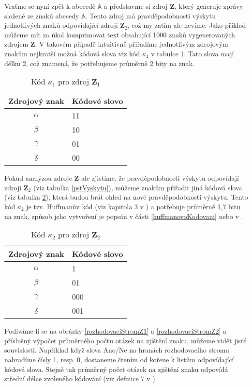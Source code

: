 Vraťme se nyní zpět k abecedě $\mathbb{A}$ a představme si zdroj $\mathbf{Z}$, který generuje zprávy složené ze znaků abecedy $\mathbb{A}$. Tento zdroj má pravděpodobnosti výskytu jednotlivých znaků odpovídající zdroji $\mathbf{Z}_2$, což my zatím ale nevíme. Jako příklad můžeme mít za úkol komprimovat text obsahující 1000 znaků vygenerovaných zdrojem $\mathbf{Z}$. V takovém případě intuitivně přiřadíme jednotlivým zdrojovým znakům nejkratší možná kódová slova viz kód $\kappa_1$ v tabulce \ref{kodovaSlovaZ1}. Tato slova mají délku 2, což znamená, že potřebujeme průměrně 2 bity na znak. 

\begin{table}[!htb]
\centering
\begin{tabular}{|c|l|}
\hline
Zdrojový znak & Kódové slovo\\
\hline
$\alpha$ & 11\\
$\beta$ & 10\\
$\gamma$ & 01\\
$\delta$ & 00\\
\hline
\end{tabular}
\caption{Kód $\kappa_1$ pro zdroj $\mathbf{Z}_1$}
\label{kodovaSlovaZ1}
\end{table}

Pokud analýzou zdroje $\mathbf{Z}$ ale zjistíme, že pravděpodobnosti výskytu odpovídají zdroji $\mathbf{Z}_2$ (viz tabulka \ref{pstVyskytu}), můžeme znakům přiřadit jiná kódová slova (viz tabulka \ref{kodovaSlovaZ2}), která budou brát ohled na nové pravděpodobnosti výskytu. Tento kód $\kappa_2$ je tzv. Huffmanův kód (viz kapitola 3 v \cite{teorieKodovani}) a potřebuje průměrně 1,7 bitu na znak, způsob jeho vytvoření je popsán v části \ref{huffmanovoKodovani} nebo v \cite{teorieKodovani}.

\begin{table}[!htb]
\centering
\begin{tabular}{|c|l|}
\hline
Zdrojový znak & Kódové slovo\\
\hline
$\alpha$ & 1\\
$\beta$ & 01\\
$\gamma$ & 000\\
$\delta$ & 001\\
\hline
\end{tabular}
\caption{Kód $\kappa_2$ pro zdroj $\mathbf{Z}_2$}
\label{kodovaSlovaZ2}
\end{table}

Podíváme-li se na obrázky \ref{rozhodovaciStromZ1} a \ref{rozhodovaciStromZ2} a příslušný výpočet průměrného počtu otázek na zjištění znaku, můžeme vidět jisté souvislosti. Například když slova Ano/Ne na hranách rozhodovacího stromu nahradíme čísly 1, resp. 0, dostaneme čtením od kořene k listům odpovídající kódová slova. Stejně tak průměrný počet otázek na zjištění znaku odpovídá střední délce zvoleného kódování (viz definice 7 v \cite{teorieKodovani}).

